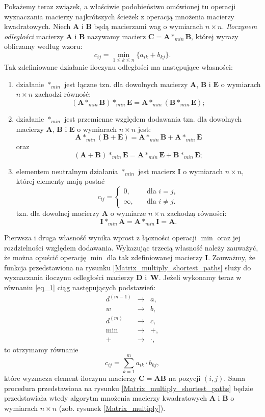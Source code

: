 \documentclass[12pt,a4paper]{book}
\theoremstyle{definition}
\numberwithin{equation}{chapter}
\begin{document}
Pokażemy teraz związek, a właściwie podobieństwo omówionej tu operacji wyznaczania macierzy najkrótszych ścieżek z operacją mnożenia macierzy kwadratowych. Niech $\mathbf{A}$ i $\mathbf{B}$ będą macierzami wag o wymiarach $n\times n$. \textit{Iloczynem odległości} macierzy $\mathbf{A}$ i $\mathbf{B}$ nazywamy macierz   $ \mathbf{C} = \mathbf{A} *_{min} \mathbf{B}$, której wyrazy obliczamy według wzoru:
\begin{equation}
\label{eq_mul}
c_{ij} = \min_{1\leq k\leq n}\{a_{ik} + b_{kj}\}.
\end{equation}
Tak zdefiniowane działanie iloczynu odległości ma następujące własności:
\begin{enumerate}
\item działanie $*_{min}$ jest łączne tzn. dla dowolnych macierzy $\mathbf{A}$, $\mathbf{B}$ i $\mathbf{E}$ o wymiarach $n\times n$ zachodzi równość:
$$
(\mathbf{A} *_{min} \mathbf{B}) *_{min} \mathbf{E}= \mathbf{A} *_{min} (\mathbf{B} *_{min} \mathbf{E});
$$
\item działanie $*_{min}$ jest przemienne względem dodawania tzn. dla dowolnych macierzy $\mathbf{A}$, $\mathbf{B}$ i $\mathbf{E}$ o wymiarach $n\times n$ jest:
$$
\mathbf{A} *_{min} (\mathbf{B} + \mathbf{E}) = \mathbf{A} *_{min} \mathbf{B} + \mathbf{A} *_{min} \mathbf{E}
$$
oraz 
$$
(\mathbf{A} + \mathbf{B}) *_{min} \mathbf{E} = \mathbf{A} *_{min} \mathbf{E} + \mathbf{B} *_{min} \mathbf{E};
$$
\item elementem neutralnym działania $*_{min}$  jest macierz $\mathbf{I}$ o wymiarach $n\times n$, której elementy mają postać
$$
c_{ij}=\left\{
\begin{array}{ll}
0,&\quad \mbox{dla $i = j$},\\
\infty,&\quad \mbox{dla $i \neq j$}.
\end{array}\right.
$$
tzn. dla dowolnej macierzy $\mathbf{A}$ o wymiarze $n\times n$ zachodzą równości:
$$
\mathbf{I} *_{min} \mathbf{A} = \mathbf{A} *_{min} \mathbf{I} = \mathbf{A}.
$$
\end{enumerate}
Pierwsza i druga własność wynika wprost z łączności operacji $\min$ oraz jej rozdzielności względem dodawania. Wykazując trzecią własność należy zauważyć, że można opuścić operację $\min$ dla tak zdefiniowanej macierzy $\mathbf{I}$. Zauważmy, że funkcja przedstawiona na rysunku \ref{Matrix_multiply_shortest_paths} służy do wyznaczania iloczynu odległości macierzy $\mathbf{D}$ i~$\mathbf{W}$. Jeżeli wykonamy teraz w równaniu \eqref{eq_1} ciąg następujących podstawień:
$$
\begin{array}{rcl}
d^{(m-1)}&\to&a,\\
w&\to&b,\\
d^{(m)}&\to&c,\\
\min&\to&+,\\
+&\to&\cdot,
\end{array}
$$
to otrzymamy równanie
$$
c_{ij} = \sum_{k=1}^{m}a_{ik} \cdot b_{kj},
$$
które wyznacza element iloczynu macierzy $\mathbf{C} = \mathbf{A}\mathbf{B}$ na pozycji $(i,j)$. Sama procedura przedstawiona na rysunku \ref{Matrix_multiply_shortest_paths} będzie przedstawiała wtedy algorytm mnożenia macierzy kwadratowych $\mathbf{A}$ i $\mathbf{B}$ o wymiarach $n\times n$ (zob. rysunek \ref{Matrix_multiply}).
\end{document}
